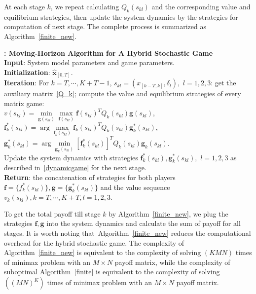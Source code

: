 At each stage $k$, we repeat calculating $Q_{k}(s_{kl})$ and the corresponding value and equilibrium strategies, then update the system dynamics by the strategies for computation of next stage. The complete process is summarized as Algorithm~\ref{finite_new}. 
\begin{alg}
\textbf{: Moving-Horizon Algorithm for A Hybrid Stochastic Game}\\
\textbf{Input}: System model parameters and game parameters.
\\\textbf{Initialization}: $\hat{\mathbf{x}}_{[0,T]}$.
\\\textbf{Iteration}: For $k=T, \cdots, K+T-1$,                                                                                 
 $s_{kl}=(x_{[k-T,k]},\delta_l),$  $l=1,2,3$:  
get  the auxiliary matrix~\eqref{Q_k};
compute the value and equilibrium strategies of every matrix game:\\
$v(s_{kl})= \min\limits_{\mathbf{g}(s_{kl})}\max\limits_{\mathbf{f}(s_{kl})} \mathbf{f}(s_{kl})^T Q_{k}(s_{kl}) \mathbf{g}(s_{kl})$,\\
$\mathbf{f}_k^{*}(s_{kl})=\arg \max\limits_{\mathbf{f}_k(s_{kl})}\mathbf{f}_k(s_{kl})^T Q_{k}(s_{kl} )\mathbf{g}_k^*(s_{kl})$, \\
$\mathbf{g}_k^{*}(s_{kl})=\arg \min\limits_{\mathbf{g}_k(s_{kl})} [\mathbf{f}_k^{*}(s_{kl})]^T Q_{k}(s_{kl}) \mathbf{g}_k(s_{kl})$.\\
Update the system dynamics with strategies $\mathbf{f}_k^{*}(s_{kl}),\mathbf{g}_k^{*}(s_{kl}),$ $l=1,2,3$ as described in~\ref{dynamicgame} for the next stage.
\\\textbf{Return}: the concatenation of strategies for both players $\mathbf{f}=\{f_k^{*}(s_{kl})\},\mathbf{g}=\{\mathbf{g}^*_k(s_{kl})\}$ and the value sequence $v_{k}(s_{kl}),k=T,\cdots, K+T, l=1,2,3$.
\label{finite_new}
\end{alg}
To get the total payoff till stage $k$ by Algorithm~\ref{finite_new}, we plug the strategies $\mathbf{f}, \mathbf{g}$ into the system dynamics and calculate the sum of payoff for all stages. It is worth noting that~Algorithm~\ref{finite_new} reduces the computational overhead for the hybrid stochastic game. The complexity of Algorithm~\ref{finite_new} is equivalent to the complexity of solving $(KMN)$ times of minimax problem with an $M \times N$ payoff matrix, while the complexity of suboptimal Algorithm~\ref{finite} is equivalent to the complexity of solving $((MN)^{K})$ times of minimax problem with an $M\times N$ payoff matrix. %

